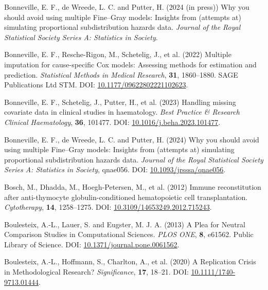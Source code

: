 \documentclass[
  letterpaper,
  paper=240mm:170mm,
  twoside=true,
  open=right,
  fontsize=10pt,
  pagesize=false,
  BCOR=15mm,
  DIV=14,
  headinclude=true,
  footinclude=false,
  headsepline=on]{scrbook}
\newlength{\cslhangindent}
\newenvironment{CSLReferences}[2] %
 {\begin{list}{}{%
  \setlength{\itemindent}{0pt}
  \setlength{\leftmargin}{0pt}
  \setlength{\parsep}{0pt}
  \ifodd #1
   \setlength{\leftmargin}{\cslhangindent}
   \setlength{\itemindent}{-1\cslhangindent}
  \fi
  \setlength{\itemsep}{#2\baselineskip}}}
 {\end{list}}
\begin{document}
\begin{CSLReferences}{1}{1}
Bonneville, E. F., de Wreede, L. C. and Putter, H. (2024 (in press)) Why
you should avoid using multiple {Fine}--{Gray} models: Insights from
(attempts at) simulating proportional subdistribution hazards data.
\emph{Journal of the Royal Statistical Society Series A: Statistics in
Society}.

Bonneville, E. F., Resche-Rigon, M., Schetelig, J., et al. (2022)
Multiple imputation for cause-specific {Cox} models: {Assessing} methods
for estimation and prediction. \emph{Statistical Methods in Medical
Research}, \textbf{31}, 1860--1880. SAGE Publications Ltd STM. DOI:
\href{https://doi.org/10.1177/09622802221102623}{10.1177/09622802221102623}.

Bonneville, E. F., Schetelig, J., Putter, H., et al. (2023) Handling
missing covariate data in clinical studies in haematology. \emph{Best
Practice \& Research Clinical Haematology}, \textbf{36}, 101477. DOI:
\href{https://doi.org/10.1016/j.beha.2023.101477}{10.1016/j.beha.2023.101477}.

Bonneville, E. F., de Wreede, L. C. and Putter, H. (2024) Why you should
avoid using multiple {Fine}--{Gray} models: Insights from (attempts at)
simulating proportional subdistribution hazards data. \emph{Journal of
the Royal Statistical Society Series A: Statistics in Society}, qnae056.
DOI:
\href{https://doi.org/10.1093/jrsssa/qnae056}{10.1093/jrsssa/qnae056}.

Bosch, M., Dhadda, M., Hoegh-Petersen, M., et al. (2012) Immune
reconstitution after anti-thymocyte globulin-conditioned hematopoietic
cell transplantation. \emph{Cytotherapy}, \textbf{14}, 1258--1275. DOI:
\href{https://doi.org/10.3109/14653249.2012.715243}{10.3109/14653249.2012.715243}.

Boulesteix, A.-L., Lauer, S. and Eugster, M. J. A. (2013) A {Plea} for
{Neutral Comparison Studies} in {Computational Sciences}. \emph{PLOS
ONE}, \textbf{8}, e61562. Public Library of Science. DOI:
\href{https://doi.org/10.1371/journal.pone.0061562}{10.1371/journal.pone.0061562}.

Boulesteix, A.-L., Hoffmann, S., Charlton, A., et al. (2020) A
{Replication Crisis} in {Methodological Research}? \emph{Significance},
\textbf{17}, 18--21. DOI:
\href{https://doi.org/10.1111/1740-9713.01444}{10.1111/1740-9713.01444}.


\end{CSLReferences}
\end{document}
